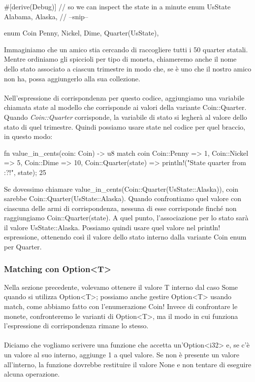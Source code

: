 \documentclass[11pt,a4paper]{article}
\begin{document}
\begin{rust}
#[derive(Debug)] // so we can inspect the state in a minute
enum UsState {
    Alabama,
    Alaska,
    // --snip--
}

enum Coin {
    Penny,
    Nickel,
    Dime,
    Quarter(UsState),
}
\end{rust}
Immaginiamo che un amico stia cercando di raccogliere tutti i 50 quarter statali. Mentre ordiniamo gli spiccioli per tipo di moneta, chiameremo anche il nome dello stato associato a ciascun trimestre in modo che, se è uno che il nostro amico non ha, possa aggiungerlo alla sua collezione.\\
\\
Nell'espressione di corrispondenza per questo codice, aggiungiamo una variabile chiamata state al modello che corrisponde ai valori della variante Coin::Quarter. Quando \textit{Coin::Quarter} corrisponde, la variabile di stato si legherà al valore dello stato di quel trimestre. Quindi possiamo usare state nel codice per quel braccio, in questo modo:
\begin{rust}
fn value_in_cents(coin: Coin) -> u8 {
    match coin {
        Coin::Penny => 1,
        Coin::Nickel => 5,
        Coin::Dime => 10,
        Coin::Quarter(state) => {
            println!("State quarter from {:?}!", state);
            25
        }
    }
}
\end{rust}
Se dovessimo chiamare value\_in\_cents(Coin::Quarter(UsState::Alaska)), coin sarebbe Coin::Quarter(UsState::Alaska). Quando confrontiamo quel valore con ciascuna delle armi di corrispondenza, nessuna di esse corrisponde finché non raggiungiamo Coin::Quarter(state). A quel punto, l'associazione per lo stato sarà il valore UsState::Alaska. Possiamo quindi usare quel valore nel println! espressione, ottenendo così il valore dello stato interno dalla variante Coin enum per Quarter.

\subsubsection{Matching con Option<T>}
Nella sezione precedente, volevamo ottenere il valore T interno dal caso Some quando si utilizza Option<T>; possiamo anche gestire Option<T> usando match, come abbiamo fatto con l'enumerazione Coin! Invece di confrontare le monete, confronteremo le varianti di Option<T>, ma il modo in cui funziona l'espressione di corrispondenza rimane lo stesso.\\
\\
Diciamo che vogliamo scrivere una funzione che accetta un'Option<i32> e, se c'è un valore al suo interno, aggiunge 1 a quel valore. Se non è presente un valore all'interno, la funzione dovrebbe restituire il valore None e non tentare di eseguire alcuna operazione.
\end{document}
